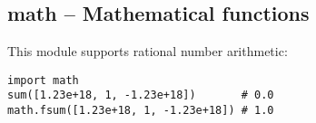 \subsection{math -- Mathematical functions}
This module supports rational number arithmetic:
\begin{verbatim}
import math
sum([1.23e+18, 1, -1.23e+18])       # 0.0
math.fsum([1.23e+18, 1, -1.23e+18]) # 1.0
\end{verbatim}
